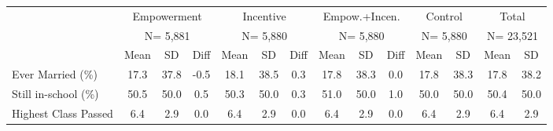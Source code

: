\begin{tabular}{lccccccccccccc}
\\
\toprule
 & \multicolumn{3}{c}{Empowerment} & \multicolumn{3}{c}{Incentive} & \multicolumn{3}{c}{Empow.+Incen.} & \multicolumn{2}{c}{Control} & \multicolumn{2}{c}{Total} \\
 & \multicolumn{3}{c}{N=    5,881} & \multicolumn{3}{c}{N=    5,880} & \multicolumn{3}{c}{N=    5,880} & \multicolumn{2}{c}{N=    5,880} & \multicolumn{2}{c}{N=   23,521} \\
\cmidrule(lr){2-4} \cmidrule(lr){5-7} \cmidrule(lr){8-10} \cmidrule(lr){11-12} \cmidrule(lr){13-14}
 & Mean & SD & Diff & Mean & SD & Diff & Mean & SD & Diff & Mean & SD & Mean & SD \\
\midrule
Ever Married (\%) &      17.3 &      37.8 &      -0.5 &      18.1 &      38.5 &       0.3 &      17.8 &      38.3 &       0.0 &      17.8 &      38.3  &      17.8 &      38.2 \\
Still in-school (\%) &      50.5 &      50.0 &       0.5 &      50.3 &      50.0 &       0.3 &      51.0 &      50.0 &       1.0 &      50.0 &      50.0  &      50.4 &      50.0 \\
Highest Class Passed &       6.4 &       2.9 &       0.0 &       6.4 &       2.9 &       0.0 &       6.4 &       2.9 &       0.0 &       6.4 &       2.9  &       6.4 &       2.9 \\
\bottomrule
\end{tabular} 
